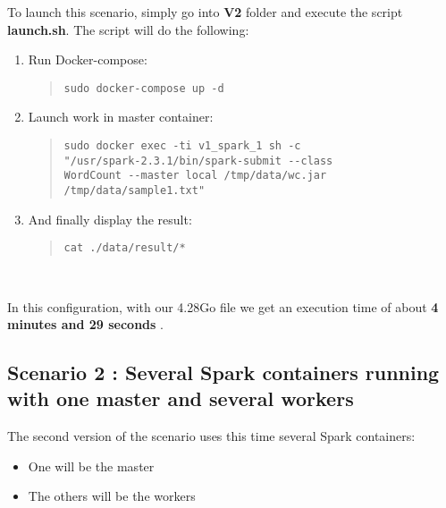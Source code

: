 \documentclass{article}
\begin{document}
\noindent To launch this scenario, simply go into \textbf{V2} folder and execute the script \textbf{launch.sh}. The script will do the following:
\begin{enumerate}
    \item Run Docker-compose:
    \begin{quote}
\begin{verbatim}
sudo docker-compose up -d
\end{verbatim}
    \end{quote}
    
    \item Launch work in master container:
    \begin{quote}
\begin{verbatim}
sudo docker exec -ti v1_spark_1 sh -c 
"/usr/spark-2.3.1/bin/spark-submit --class 
WordCount --master local /tmp/data/wc.jar 
/tmp/data/sample1.txt"
\end{verbatim}
    \end{quote}
    
    \item And finally display the result:
    \begin{quote}
\begin{verbatim}
cat ./data/result/*
\end{verbatim}
    \end{quote}
\end{enumerate}
\ \

\noindent In this configuration, with our 4.28Go file we get an execution time of about \textbf{4 minutes and 29 seconds} .



\subsection{Scenario 2 : Several Spark containers running with one master and several workers}

The second version of the scenario uses this time several Spark containers:
\begin{itemize}
  \item One will be the master
  \item The others will be the workers
\end{itemize}
\ \
\end{document}
